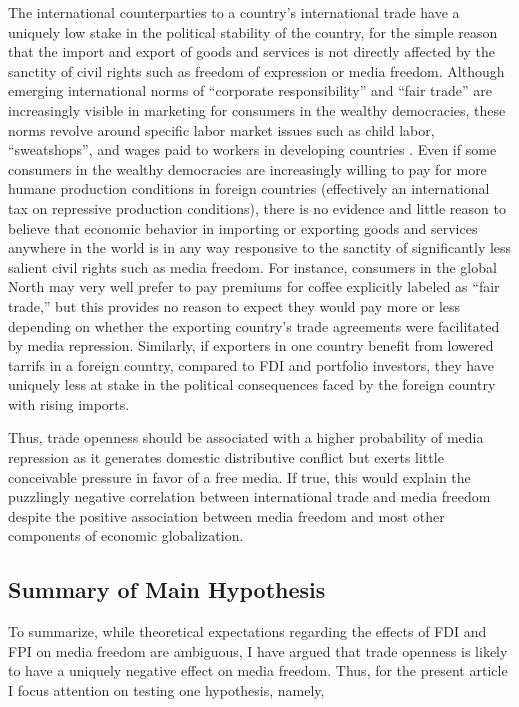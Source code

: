 \documentclass[12pt,a4paper]{article}\usepackage[]{graphicx}\usepackage[]{color}
\begin{document}
The international counterparties to a country's international trade have a uniquely low stake in the political stability of the country, for the simple reason that the import and export of goods and services is not directly affected by the sanctity of civil rights such as freedom of expression or media freedom. Although emerging international norms of “corporate responsibility” and “fair trade” are increasingly visible in marketing for consumers in the wealthy democracies, these norms revolve around specific labor market issues such as child labor, ``sweatshops'', and wages paid to workers in developing countries \parencite{Moore:2004gy}. Even if some consumers in the wealthy democracies are increasingly willing to pay for more humane production conditions in foreign countries (effectively an international tax on repressive production conditions), there is no evidence and little reason to believe that economic behavior in importing or exporting goods and services anywhere in the world is in any way responsive to the sanctity of significantly less salient civil rights such as media freedom. For instance, consumers in the global North may very well prefer to pay premiums for coffee explicitly labeled as “fair trade,” but this provides no reason to expect they would pay more or less depending on whether the exporting country's trade agreements were facilitated by media repression. Similarly, if exporters in one country benefit from lowered tarrifs in a foreign country, compared to FDI and portfolio investors, they have uniquely less at stake in the political consequences faced by the foreign country with rising imports.

Thus, trade openness should be associated with a higher probability of media repression as it generates domestic distributive conflict but exerts little conceivable pressure in favor of a free media. If true, this would explain the puzzlingly negative correlation between international trade and media freedom despite the positive association between media freedom and most other components of economic globalization.

\subsection{Summary of Main Hypothesis}

To summarize, while theoretical expectations regarding the effects of FDI and FPI on media freedom are ambiguous, I have argued that trade openness is likely to have a uniquely negative effect on media freedom. Thus, for the present article I focus attention on testing one hypothesis, namely,
\end{document}

